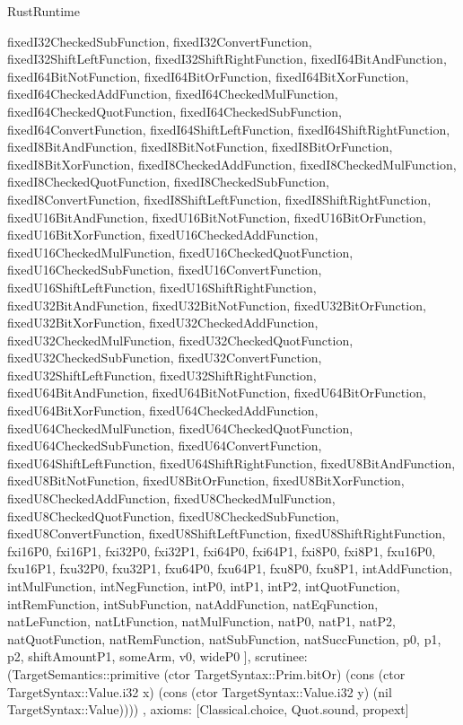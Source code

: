 \begin{lexlean}{RustRuntime}
\begin{semanticmodule}
{{      fixedI32CheckedSubFunction,
      fixedI32ConvertFunction,
      fixedI32ShiftLeftFunction,
      fixedI32ShiftRightFunction,
      fixedI64BitAndFunction,
      fixedI64BitNotFunction,
      fixedI64BitOrFunction,
      fixedI64BitXorFunction,
      fixedI64CheckedAddFunction,
      fixedI64CheckedMulFunction,
      fixedI64CheckedQuotFunction,
      fixedI64CheckedSubFunction,
      fixedI64ConvertFunction,
      fixedI64ShiftLeftFunction,
      fixedI64ShiftRightFunction,
      fixedI8BitAndFunction,
      fixedI8BitNotFunction,
      fixedI8BitOrFunction,
      fixedI8BitXorFunction,
      fixedI8CheckedAddFunction,
      fixedI8CheckedMulFunction,
      fixedI8CheckedQuotFunction,
      fixedI8CheckedSubFunction,
      fixedI8ConvertFunction,
      fixedI8ShiftLeftFunction,
      fixedI8ShiftRightFunction,
      fixedU16BitAndFunction,
      fixedU16BitNotFunction,
      fixedU16BitOrFunction,
      fixedU16BitXorFunction,
      fixedU16CheckedAddFunction,
      fixedU16CheckedMulFunction,
      fixedU16CheckedQuotFunction,
      fixedU16CheckedSubFunction,
      fixedU16ConvertFunction,
      fixedU16ShiftLeftFunction,
      fixedU16ShiftRightFunction,
      fixedU32BitAndFunction,
      fixedU32BitNotFunction,
      fixedU32BitOrFunction,
      fixedU32BitXorFunction,
      fixedU32CheckedAddFunction,
      fixedU32CheckedMulFunction,
      fixedU32CheckedQuotFunction,
      fixedU32CheckedSubFunction,
      fixedU32ConvertFunction,
      fixedU32ShiftLeftFunction,
      fixedU32ShiftRightFunction,
      fixedU64BitAndFunction,
      fixedU64BitNotFunction,
      fixedU64BitOrFunction,
      fixedU64BitXorFunction,
      fixedU64CheckedAddFunction,
      fixedU64CheckedMulFunction,
      fixedU64CheckedQuotFunction,
      fixedU64CheckedSubFunction,
      fixedU64ConvertFunction,
      fixedU64ShiftLeftFunction,
      fixedU64ShiftRightFunction,
      fixedU8BitAndFunction,
      fixedU8BitNotFunction,
      fixedU8BitOrFunction,
      fixedU8BitXorFunction,
      fixedU8CheckedAddFunction,
      fixedU8CheckedMulFunction,
      fixedU8CheckedQuotFunction,
      fixedU8CheckedSubFunction,
      fixedU8ConvertFunction,
      fixedU8ShiftLeftFunction,
      fixedU8ShiftRightFunction,
      fxi16P0,
      fxi16P1,
      fxi32P0,
      fxi32P1,
      fxi64P0,
      fxi64P1,
      fxi8P0,
      fxi8P1,
      fxu16P0,
      fxu16P1,
      fxu32P0,
      fxu32P1,
      fxu64P0,
      fxu64P1,
      fxu8P0,
      fxu8P1,
      intAddFunction,
      intMulFunction,
      intNegFunction,
      intP0,
      intP1,
      intP2,
      intQuotFunction,
      intRemFunction,
      intSubFunction,
      natAddFunction,
      natEqFunction,
      natLeFunction,
      natLtFunction,
      natMulFunction,
      natP0,
      natP1,
      natP2,
      natQuotFunction,
      natRemFunction,
      natSubFunction,
      natSuccFunction,
      p0,
      p1,
      p2,
      shiftAmountP1,
      someArm,
      v0,
      wideP0
    ],
    scrutinee: (TargetSemantics::primitive (ctor TargetSyntax::Prim.bitOr) (cons (ctor TargetSyntax::Value.i32 x) (cons (ctor TargetSyntax::Value.i32 y) (nil TargetSyntax::Value))))
  },
  axioms: [Classical.choice, Quot.sound, propext]
}


\end{semanticmodule}
\end{lexlean}
